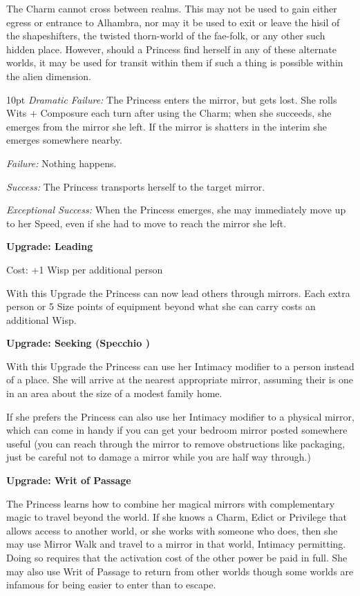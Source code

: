 The Charm cannot cross between realms. This may not be used to gain either egress or entrance to Alhambra, nor may it be used to exit or leave the hisil of the shapeshifters, the twisted thorn-world of the fae-folk, or any other such hidden place. However, should a Princess find herself in any of these alternate worlds, it may be used for transit within them if such a thing is possible within the alien dimension.

\begin{myindentpar}{10pt}    \emph{Dramatic Failure:} The Princess enters the mirror, but gets lost. She rolls Wits + Composure each turn after using the Charm; when she succeeds, she emerges from the mirror she left. If the mirror is shatters in the interim she emerges somewhere nearby. 
    
	\emph{Failure:} Nothing happens.
    
	\emph{Success:} The Princess transports herself to the target mirror.
    
	\emph{Exceptional Success:} When the Princess emerges, she may immediately move up to her Speed, even if she had to move to reach the mirror she left.

\textbf{Upgrade: Leading}

\noindent Cost: +1 Wisp per additional person

With this Upgrade the Princess can now lead others through mirrors. Each extra person or 5 Size points of equipment beyond what she can carry costs an additional Wisp.

\textbf{Upgrade: Seeking (Specchio \textbullet\textbullet\textbullet)}

With this Upgrade the Princess can use her Intimacy modifier to a person instead of a place. She will arrive at the nearest appropriate mirror, assuming their is one in an area about the size of a modest family home. 

If she prefers the Princess can also use her Intimacy modifier to a physical mirror, which can come in handy if you can get your bedroom mirror posted somewhere useful (you can reach through the mirror to remove obstructions like packaging, just be careful not to damage a mirror while you are half way through.) 

\textbf{Upgrade: Writ of Passage}

The Princess learns how to combine her magical mirrors with complementary magic to travel beyond the world. If she knows a Charm, Edict or Privilege that allows access to another world, or she works with someone who does, then she may use Mirror Walk and travel to a mirror in that world, Intimacy permitting. Doing so requires that the activation cost of the other power be paid in full. She may also use Writ of Passage to return from other worlds \textendash though some worlds are infamous for being easier to enter than to escape. 


\end{myindentpar}
